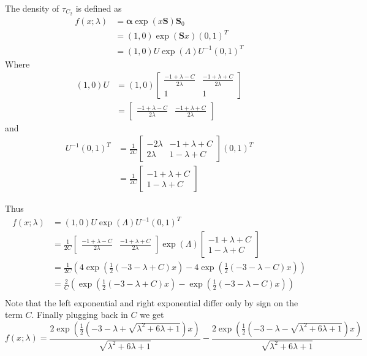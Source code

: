 The density of $\tau_{C_2}$ is defined as
\begin{align*}
 f(x; \lambda) &= \boldsymbol{\alpha} \exp(x \mathbf{S}) \mathbf{S}_0 \nonumber\\
 &= (1, 0) \exp(\mathbf{S} x) (0,1)^T \\
 &= (1, 0) U \exp(\Lambda) U^{-1} (0,1)^T
\end{align*}
Where
\begin{align*}
    (1,0) U &= (1,0) \begin{bmatrix}
    \frac{-1 + \lambda - C}{2\lambda} & \frac{-1 + \lambda + C}{2\lambda}\\
    1 & 1
\end{bmatrix}\\
    &= \begin{bmatrix}
    \frac{-1 + \lambda - C}{2\lambda} & \frac{-1 + \lambda + C}{2\lambda}
    \end{bmatrix}
\end{align*}
and
\begin{align*}
    U^{-1} (0,1)^T &= \frac{1}{2C} \begin{bmatrix}
    -2\lambda & -1 + \lambda + C\\
    2\lambda & 1 - \lambda + C
    \end{bmatrix} (0,1)^T\\
    &= \frac{1}{2C} \begin{bmatrix}
    -1 + \lambda + C\\
    1 - \lambda + C
    \end{bmatrix}
\end{align*}

Thus
\begin{align*}
     f(x; \lambda) &= (1, 0) U \exp(\Lambda) U^{-1} (0,1)^T\\
     &= \frac{1}{2C} \begin{bmatrix}
    \frac{-1 + \lambda - C}{2\lambda} & \frac{-1 + \lambda + C}{2\lambda}
    \end{bmatrix} \exp(\Lambda)  \begin{bmatrix}
    -1 + \lambda + C\\
    1 - \lambda + C
    \end{bmatrix}\\
    &= \frac{1}{2C} \left( 4 \exp\left(\frac{1}{2}(-3 - \lambda + C) x\right) - 4 \exp\left(\frac{1}{2}(-3 - \lambda - C) x\right) \right)\\
    &= \frac{2}{C} \left( \exp\left(\frac{1}{2}(-3 - \lambda + C) x\right) - \exp\left(\frac{1}{2}(-3 - \lambda - C) x\right) \right)\\
\end{align*}
Note that the left exponential and right exponential differ only by sign on the term $C$.
Finally plugging back in $C$ we get
\begin{equation} \label{eq:t_density}
      f(x; \lambda) = \frac{2 \exp\left(\frac{1}{2}(-3 - \lambda + \sqrt{\lambda^2 + 6 \lambda + 1}) x\right)}{\sqrt{\lambda^2 + 6 \lambda + 1}}  - \frac{2 \exp\left(\frac{1}{2}(-3 - \lambda - \sqrt{\lambda^2 + 6 \lambda + 1}) x\right)}{\sqrt{\lambda^2 + 6 \lambda + 1}}
\end{equation}

